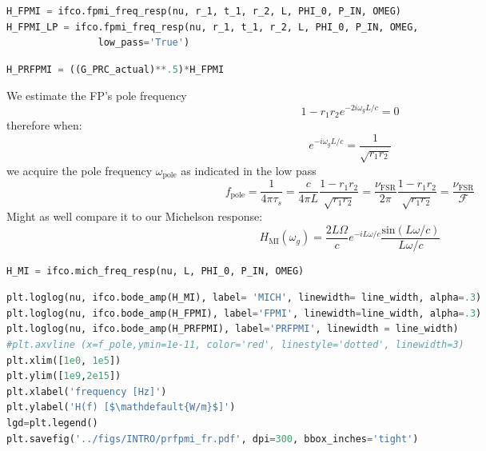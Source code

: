 \begin{spacing}{1}\begin{lstlisting}[frame=single, language=Python]
H_FPMI = ifco.fpmi_freq_resp(nu, r_1, t_1, r_2, L, PHI_0, P_IN, OMEG)
H_FPMI_LP = ifco.fpmi_freq_resp(nu, r_1, t_1, r_2, L, PHI_0, P_IN, OMEG, 
				low_pass='True')
\end{lstlisting}\end{spacing}

\begin{spacing}{1}\begin{lstlisting}[frame=single, language=Python]
H_PRFPMI = ((G_PRC_actual)**.5)*H_FPMI
\end{lstlisting}\end{spacing}

We estimate the FP's pole frequency
\begin{equation}  1 - r_1 r_2 e^{-2i \omega_g L / c} = 0 \end{equation} therefore when:
\begin{equation} e^{-i \omega_g L / c} = \frac{1}{\sqrt{r_1 r_2}} \end{equation} we acquire the
pole frequency \(\omega_\mathrm{pole}\) as indicated in the low pass
\begin{equation} f_\mathrm{pole} = \frac{1}{4\pi \tau_{s}} =  \frac{c}{4 \pi L} \frac{1- r_1 r_2}{\sqrt{r_1 r_2}} = \frac{\nu_\mathrm{FSR}}{2 \pi} \frac{1- r_1 r_2}{\sqrt{r_1 r_2}} = \frac{\nu_\mathrm{FSR}}{\mathcal{F}} \end{equation}Might
as well compare it to our Michelson response:
\begin{equation} H_{\mathrm{MI}}(\omega_g) = \frac{2 L \Omega}{c}e^{-i L \omega / c} \frac{\mathrm{sin}(L \omega /c)}{L \omega /c} \end{equation}

\begin{spacing}{1}\begin{lstlisting}[frame=single, language=Python]
H_MI = ifco.mich_freq_resp(nu, L, PHI_0, P_IN, OMEG)
\end{lstlisting}\end{spacing}

\begin{spacing}{1}\begin{lstlisting}[frame=single, language=Python]
plt.loglog(nu, ifco.bode_amp(H_MI), label= 'MICH', linewidth= line_width, alpha=.3)
plt.loglog(nu, ifco.bode_amp(H_FPMI), label='FPMI', linewidth=line_width, alpha=.3)
plt.loglog(nu, ifco.bode_amp(H_PRFPMI), label='PRFPMI', linewidth = line_width)
#plt.axvline (x=f_pole,ymin=1e-11, color='red', linestyle='dotted', linewidth=3)
plt.xlim([1e0, 1e5])
plt.ylim([1e9,2e15])
plt.xlabel('frequency [Hz]')
plt.ylabel('H(f) [$\mathdefault{W/m}$]')
lgd=plt.legend()
plt.savefig('../figs/INTRO/prfpmi_fr.pdf', dpi=300, bbox_inches='tight')
\end{lstlisting}\end{spacing}

